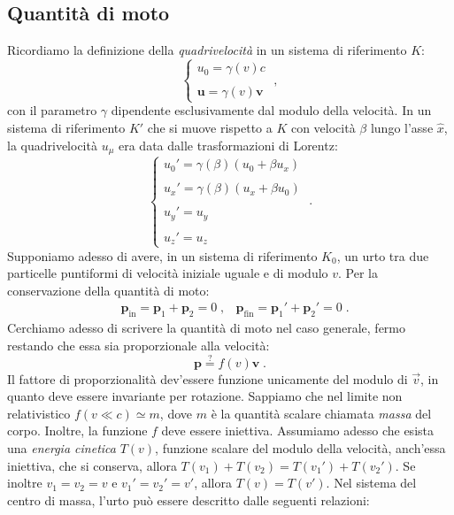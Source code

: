 \subsection{Quantità di moto}
Ricordiamo la definizione della \textit{quadrivelocità} in un sistema di riferimento $K$:
\begin{equation}
 \begin{cases}
  u_0=\gamma(v)c \\
\\
\mathbf{u}=\gamma(v)\mathbf{v}
 \end{cases}\;,
\end{equation}
con il parametro $\gamma$ dipendente esclusivamente dal modulo della velocità. In un sistema di riferimento $K'$ che si muove rispetto a $K$ con velocità $\beta$ lungo l'asse $\hat{x}$, la quadrivelocità $u_{\mu}$ era data dalle trasformazioni di Lorentz:
\begin{equation}
 \begin{cases}
u_0'=\gamma(\beta)(u_0+\beta u_x) \\
\\
u_x'=\gamma(\beta)(u_x+\beta u_0) \\
\\
u_y'=u_y \\
\\
u_z'=u_z  
 \end{cases}\;.
\end{equation}
Supponiamo adesso di avere, in un sistema di riferimento $K_0$, un urto tra due particelle puntiformi di velocità iniziale uguale e di 
modulo $v$. Per la conservazione della quantità di moto:
\begin{align}
&\mathbf{p}_{\mathrm{in}}=\mathbf{p}_1+\mathbf{p}_2=0\;, &\mathbf{p}_{\mathrm{fin}}=\mathbf{p}_1'+\mathbf{p}_2'=0\;.
\end{align}
Cerchiamo adesso di scrivere la quantità di moto nel caso generale, fermo restando che essa sia proporzionale alla velocità:
\begin{equation}
 \mathbf{p}\stackrel{?}{=}f(v)\mathbf{v}\;. \label{ch4_tobedet}
\end{equation}
Il fattore di proporzionalità dev'essere funzione unicamente del modulo di $\vec{v}$, in quanto deve essere invariante per rotazione. 
Sappiamo che nel limite non relativistico $f(v\ll c)\simeq m$, dove $m$ è la quantità scalare chiamata \textit{massa} del corpo. Inoltre, la funzione $f$ deve essere iniettiva. Assumiamo adesso che esista una \textit{energia cinetica} $T(v)$, funzione scalare del modulo della velocità, anch'essa iniettiva, che si conserva, allora $T(v_1)+T(v_2)=T(v_1')+T(v_2')$. Se inoltre $v_1=v_2=v$ e $v_1'=v_2'=v'$, allora $T(v)=T(v')$. Nel sistema del centro di massa, l'urto può essere descritto dalle seguenti relazioni:
